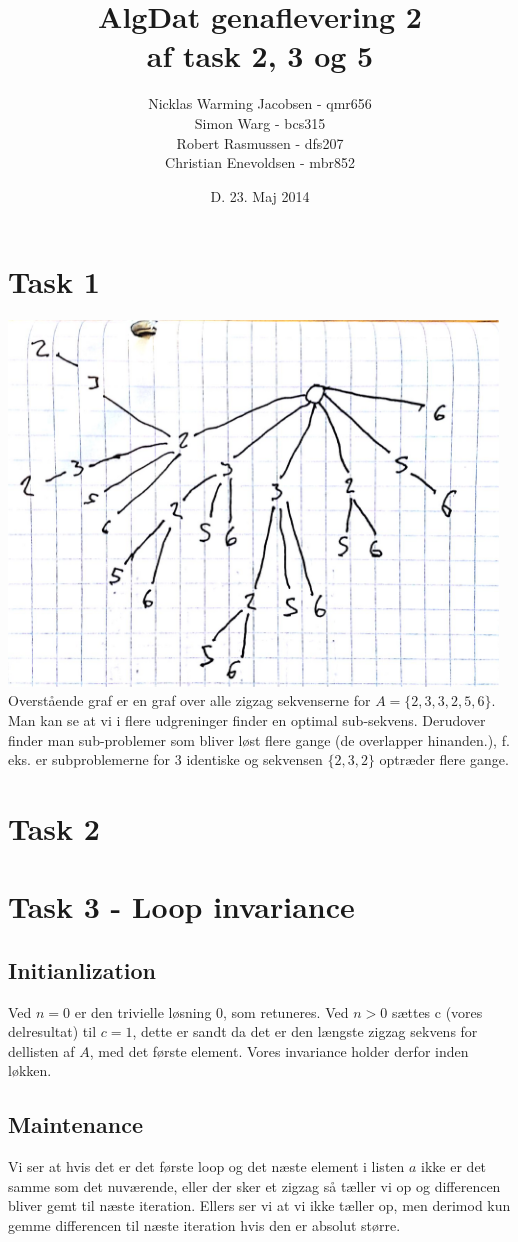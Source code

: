 \documentclass[12pt]{article}
\title{AlgDat genaflevering 2\\af task 2, 3 og 5}
\author{Nicklas Warming Jacobsen - qmr656\\Simon Warg - bcs315\\Robert Rasmussen - dfs207\\Christian Enevoldsen - mbr852}
\date{D. 23. Maj 2014}
\begin{document}
\maketitle
\newpage
\section*{Task 1}
\includegraphics[width=13cm]{tree.png}\\
Overstående graf er en graf over alle zigzag sekvenserne for $A=\{2,3,3,2,5,6\}$. Man kan se at vi i flere udgreninger finder en optimal sub-sekvens. Derudover finder man sub-problemer som bliver løst flere gange (de overlapper hinanden.), f. eks. er subproblemerne for $3$ identiske og sekvensen $\{2,3,2\}$ optræder flere gange.
\newpage
\section*{Task 2}

\section*{Task 3 - Loop invariance}
\subsection*{Initianlization}
Ved $n=0$ er den trivielle løsning 0, som retuneres. Ved $n > 0$ sættes c (vores delresultat) til $c = 1$, dette er sandt da det er den længste zigzag sekvens for dellisten af $A$, med det første element.
Vores invariance holder derfor inden løkken.
\subsection*{Maintenance}
Vi ser at hvis det er det første loop og det næste element i listen $a$ ikke er det samme som det nuværende, eller der sker et zigzag så tæller vi op og differencen bliver gemt til næste iteration.
Ellers ser vi at vi ikke tæller op, men derimod kun gemme differencen til næste iteration hvis den er absolut større.
\end{document}

